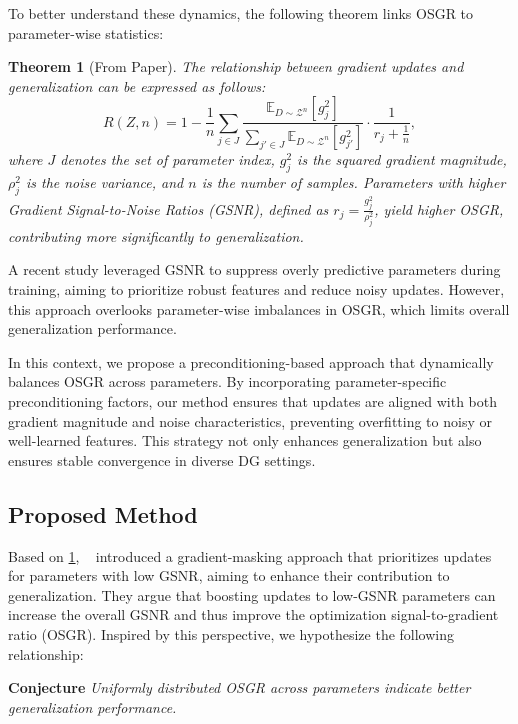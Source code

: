 \documentclass{article}
\theoremstyle{plain}
\newtheorem{theorem}{Theorem}[section]
\theoremstyle{definition}
\theoremstyle{remark}
\begin{document}
To better understand these dynamics, the following theorem links OSGR to parameter-wise statistics:
\begin{theorem}[From Paper\cite{gsnr}]\label{thm:th1}
The relationship between gradient updates and generalization can be expressed as follows:
\begin{equation}
R(Z,n) = 1-\frac{1}{n}\sum_{j\in J }\frac{\mathbb{E}_{D\sim\mathcal{Z}^n}[g_j^2]}{\sum_{j' \in J }\mathbb{E}_{D\sim\mathcal{Z}^n}[g_{j'}^2]} \cdot \frac{1}{ r_j + \frac{1}{n}},
\end{equation}
where \(J\) denotes the set of parameter index, \(g_j^2\) is the squared gradient magnitude, \(\rho_j^2\) is the noise variance, and \(n\) is the number of samples. Parameters with higher Gradient Signal-to-Noise Ratios (GSNR), defined as \(r_j = \frac{g_j^2}{\rho_j^2}\), yield higher OSGR, contributing more significantly to generalization.
\end{theorem}

A recent study \cite{dg_dropout} leveraged GSNR to suppress overly predictive parameters during training, aiming to prioritize robust features and reduce noisy updates. However, this approach overlooks parameter-wise imbalances in  OSGR, which limits overall generalization performance.

In this context, we propose a preconditioning-based approach that dynamically balances OSGR across parameters. By incorporating parameter-specific preconditioning factors, our method ensures that updates are aligned with both gradient magnitude and noise characteristics, preventing overfitting to noisy or well-learned features. This strategy not only enhances generalization but also ensures stable convergence in diverse DG settings.

\subsection{Proposed Method}
Based on \cref{thm:th1}, ~\citet{dg_dropout} introduced a gradient-masking approach that prioritizes updates for parameters with low GSNR, aiming to enhance their contribution to generalization. They argue that boosting updates to low-GSNR parameters can increase the overall GSNR and thus improve the optimization signal-to-gradient ratio (OSGR). Inspired by this perspective, we hypothesize the following relationship:

\textbf{Conjecture}
\textit{Uniformly distributed OSGR across parameters indicate better generalization performance.}
\end{document}

